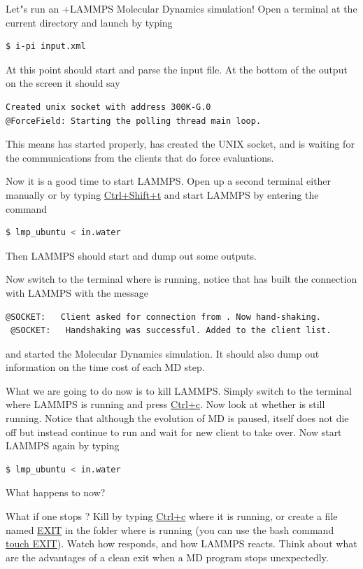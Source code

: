 \documentclass{article}
\begin{document}
\begin{Exercise}[label={i-pi},title={Molecular Dynamics: a client/server approach}]
\Question
Let"s run an \ipi{}+LAMMPS Molecular Dynamics simulation!
Open a terminal at the current directory and
launch \ipi{} by typing
\begin{lstlisting}[language=bash]
$ i-pi input.xml
\end{lstlisting}
At this point \ipi{} should start 
and parse the input file. At the bottom of the output on the screen it should say
\begin{lstlisting}[language=bash]
Created unix socket with address 300K-G.0
@ForceField: Starting the polling thread main loop.
\end{lstlisting}
This means \ipi{} has started properly, has created the UNIX socket, and is waiting for the communications from the clients that do force evaluations.

\Question
Now it is a good time to start LAMMPS.
Open up a second terminal either manually or by typing \url{Ctrl+Shift+t}
and start LAMMPS by entering the command
\begin{lstlisting}[language=bash]
$ lmp_ubuntu < in.water
\end{lstlisting}
Then LAMMPS should start and dump out some outputs.

\Question
Now switch to the terminal where \ipi{} is running, notice that \ipi{} has built the connection with LAMMPS with the message
\begin{lstlisting}[language=sh]
 @SOCKET:   Client asked for connection from . Now hand-shaking.
 @SOCKET:   Handshaking was successful. Added to the client list.
\end{lstlisting}
and started the Molecular Dynamics simulation.
It should also dump out information on the time cost of each MD step.

\Question
What we are going to do now is to kill LAMMPS.
Simply switch to the terminal where LAMMPS is running and press \url{Ctrl+c}.
Now look at whether \ipi{} is still running.
Notice that although the evolution of MD is paused, \ipi{} itself does not die off but instead continue to run and wait for new client to take over.
Now start LAMMPS again by typing
\begin{lstlisting}[language=bash]
$ lmp_ubuntu < in.water
\end{lstlisting}
What happens to \ipi{} now?

\Question
What if one stops \ipi{}? 
Kill \ipi{} by typing \url{Ctrl+c} where it is running, or create a file named \url{EXIT} in the folder where \ipi{} is running
(you can use the bash command \url{touch EXIT}).
Watch how \ipi{} responds, and how LAMMPS reacts.
Think about what are the advantages of a clean exit when a MD program stops unexpectedly.


\end{Exercise}
\end{document}
